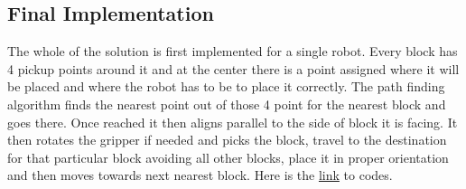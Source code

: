 \documentclass[a4paper,12pt,oneside]{book}
\begin{document}
\subsection*{Final Implementation}
The whole of the solution is first implemented for a single robot. Every block has 4 pickup points around it and at the center there is a point assigned where it will be placed and where the robot has to be to place it correctly. The path finding algorithm finds the nearest point out of those 4 point for the nearest block and goes there. Once reached it then aligns parallel to the side of block it is facing. It then rotates the gripper if needed and picks the block, travel to the destination for that particular block avoiding all other blocks, place it in proper orientation and then moves towards next nearest block. Here is the \href{https://github.com/eYSIP-2018/Jigsaw_Puzzle_Solver_using_Multiple_Robots/tree/master/Final Codes}{link} to codes.
\end{document}
